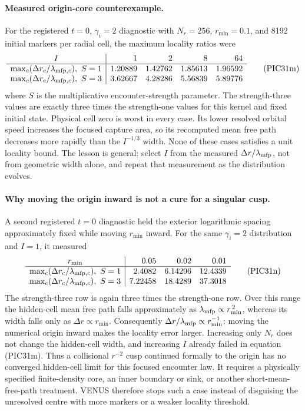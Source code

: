 \paragraph{Measured origin-core counterexample.}
For the registered \(t=0\), \(\gamma_i=2\) diagnostic with
\(N_r=256\), \(r_{\min}=0.1\), and 8192 initial markers per radial cell, the
maximum locality ratios were
\[
\begin{array}{c|rrrr}
 I & 1 & 2 & 8 & 64\\ \hline
 \max_c(\Delta r_c/\lambda_{{\rm mfp},c}),\ S=1
   &1.20889&1.42762&1.85613&1.96592\\
 \max_c(\Delta r_c/\lambda_{{\rm mfp},c}),\ S=3
   &3.62667&4.28286&5.56839&5.89776
\end{array}                                               \tag{PIC31m}
\]
where \(S\) is the multiplicative encounter-strength parameter.  The
strength-three values are exactly three times the strength-one values for
this kernel and fixed initial state.  Physical cell zero is worst in every
case.  Its lower resolved orbital speed increases the focused capture area,
so its recomputed mean free path decreases more rapidly than the
\(I^{-1/3}\) width.  None of these cases satisfies a unit locality bound.
The lesson is general: select \(I\) from the measured
\(\Delta r/\lambda_{\rm mfp}\), not from geometric width alone, and repeat
that measurement as the distribution evolves.

\paragraph{Why moving the origin inward is not a cure for a singular cusp.}
A second registered \(t=0\) diagnostic held the exterior logarithmic spacing
approximately fixed while moving \(r_{\min}\) inward.  For the same
\(\gamma_i=2\) distribution and \(I=1\), it measured
\[
\begin{array}{c|rrr}
r_{\min} & 0.05 & 0.02 & 0.01\\ \hline
\max_c(\Delta r_c/\lambda_{{\rm mfp},c}),\ S=1
  &2.4082&6.14296&12.4339\\
\max_c(\Delta r_c/\lambda_{{\rm mfp},c}),\ S=3
  &7.22458&18.4289&37.3018
\end{array}                                               \tag{PIC31n}
\]
The strength-three row is again three times the strength-one row.  Over this
range the hidden-cell mean free path falls approximately as
\(\lambda_{\rm mfp}\propto r_{\min}^{\,2}\), whereas its width falls only as
\(\Delta r\propto r_{\min}\).  Consequently
\(\Delta r/\lambda_{\rm mfp}\propto r_{\min}^{-1}\): moving the numerical
origin inward makes the locality error larger.  Increasing only \(N_r\) does
not change the hidden-cell width, and increasing \(I\) already failed in
equation (PIC31m).  Thus a collisional \(r^{-2}\) cusp continued formally to
the origin has no converged hidden-cell limit for this focused encounter law.
It requires a physically specified finite-density core, an inner boundary or
sink, or another short-mean-free-path treatment.  VENUS therefore stops such
a case instead of disguising the unresolved centre with more markers or a
weaker locality threshold.

